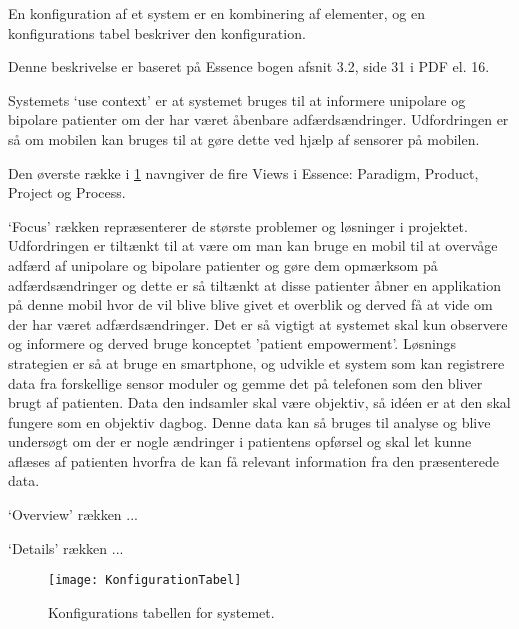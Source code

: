En konfiguration af et system er en kombinering af elementer, og en konfigurations tabel beskriver den konfiguration.

Denne beskrivelse er baseret på Essence bogen afsnit 3.2, side 31 i PDF el. 16.

Systemets `use context' er at systemet bruges til at informere unipolare og bipolare patienter om der har været åbenbare adfærdsændringer. Udfordringen er så om mobilen kan bruges til at gøre dette ved hjælp af sensorer på mobilen.



Den øverste række i \cref{tab:konfigurationsTabel} navngiver de fire Views i Essence: Paradigm, Product, Project og Process.

`Focus' rækken repræsenterer de største problemer og løsninger i projektet. 
Udfordringen er tiltænkt til at være om man kan bruge en mobil til at overvåge adfærd af unipolare og bipolare patienter og gøre dem opmærksom på adfærdsændringer og dette er så tiltænkt at disse patienter åbner en applikation på denne mobil hvor de vil blive blive givet et overblik og derved få at vide om der har været adfærdsændringer. 
Det er så vigtigt at systemet skal kun observere og informere og derved bruge konceptet 'patient empowerment'.
Løsnings strategien er så at bruge en smartphone, og udvikle et system som kan registrere data fra forskellige sensor moduler og gemme det på telefonen som den bliver brugt af patienten.
Data den indsamler skal være objektiv, så idéen er at den skal fungere som en objektiv dagbog.
Denne data kan så bruges til analyse og blive undersøgt om der er nogle ændringer i patientens opførsel og skal let kunne aflæses af patienten hvorfra de kan få relevant information fra den præsenterede data. 

`Overview' rækken ...

`Details' rækken ...

\begin{figure}[h]
\texttt{[image: KonfigurationTabel]}
\caption{Konfigurations tabellen for systemet.}
\label{tab:konfigurationsTabel}
\end{figure}
